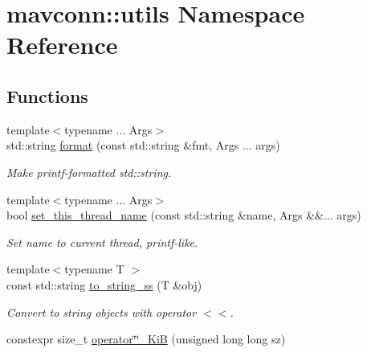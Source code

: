 \hypertarget{namespacemavconn_1_1utils}{}\section{mavconn\+::utils Namespace Reference}
\label{namespacemavconn_1_1utils}
\subsection*{Functions}
\begin{DoxyCompactItemize}
\item 
{\footnotesize template$<$typename ... Args$>$ }\\std\+::string \mbox{\hyperlink{group__mavutils_ga0d03da68919138512c198995276dd9ea}{format}} (const std\+::string \&fmt, Args ... args)
\begin{DoxyCompactList}\small\item\em Make printf-\/formatted std\+::string. \end{DoxyCompactList}\item 
{\footnotesize template$<$typename ... Args$>$ }\\bool \mbox{\hyperlink{group__mavutils_gac5ea11f12ae2183df1dc4a810ff0a87b}{set\+\_\+this\+\_\+thread\+\_\+name}} (const std\+::string \&name, Args \&\&... args)
\begin{DoxyCompactList}\small\item\em Set name to current thread, printf-\/like. \end{DoxyCompactList}\item 
{\footnotesize template$<$typename T $>$ }\\const std\+::string \mbox{\hyperlink{group__mavutils_ga6c132876dd85249684a7935fe0bc8f51}{to\+\_\+string\+\_\+ss}} (T \&obj)
\begin{DoxyCompactList}\small\item\em Convert to string objects with operator $<$$<$. \end{DoxyCompactList}\item 
constexpr size\+\_\+t \mbox{\hyperlink{group__mavutils_ga301ff0ee568776aa543ccaff3c1c039c}{operator\char`\"{}\char`\"{}\+\_\+\+KiB}} (unsigned long long sz)
\end{DoxyCompactItemize}
